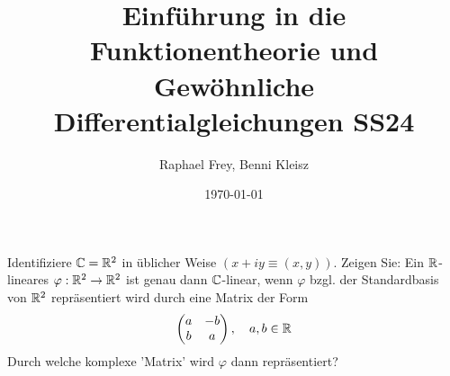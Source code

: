 \documentclass[ngerman]{report}
\title{Einführung in die Funktionentheorie und Gewöhnliche Differentialgleichungen SS24}
\author{Raphael Frey, Benni Kleisz}
\institute{Universität Tübingen}
\date{\today}
\begin{document}
    \maketitle
    \begin{question}
        Identifiziere $\mathbb{C} = \mathbb{R}^2$ in üblicher Weise $(x + i y \equiv (x, y))$. Zeigen Sie: Ein $\mathbb{R}$-lineares $\varphi : \mathbb{R}^2 \to \mathbb{R}^2$ ist genau dann $\mathbb{C}$-linear, wenn $\varphi$ bzgl. der Standardbasis von $\mathbb{R}^2$ repräsentiert wird durch eine Matrix der Form 
        \begin{align*}
            \begin{pmatrix}
                a & -b\\
                b & a
            \end{pmatrix}, \quad a,b\in \mathbb{R}
        \end{align*}
        Durch welche komplexe 'Matrix' wird $\varphi$ dann repräsentiert?
    \end{question}
\end{document}
